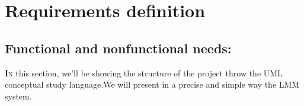\documentclass[12pt]{book}
\begin{document}
\section{Requirements definition}
\subsection{Functional and nonfunctional needs:}
\lettrine[findent=1pt]{\textbf{I}}{n} this section, we'll be showing the structure of the project throw the UML conceptual study language.We will present in a precise and simple way the LMM system.

\end{document}
